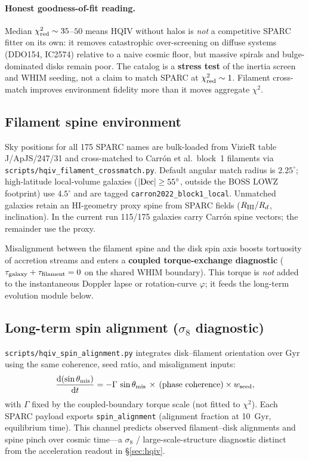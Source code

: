 \documentclass[11pt]{amsart}
\begin{document}
\paragraph{Honest goodness-of-fit reading.}
Median $\chi^2_{\rm red}\sim 35$--$50$ means HQIV without halos is \emph{not} a
competitive SPARC fitter on its own: it removes catastrophic over-screening on diffuse
systems (DDO154, IC2574) relative to a naive cosmic floor, but massive spirals and
bulge-dominated disks remain poor. The catalog is a \textbf{stress test} of the inertia
screen and WHIM seeding, not a claim to match SPARC at $\chi^2_{\rm red}\sim 1$.
Filament cross-match improves environment fidelity more than it moves aggregate $\chi^2$.

\subsection{Filament spine environment}
Sky positions for all 175 SPARC names are bulk-loaded from VizieR table
J/ApJS/247/31 and cross-matched to Carrón et al.\ block~1 filaments
\cite{carron2022filaments} via \texttt{scripts/hqiv\_filament\_crossmatch.py}.
Default angular match radius is $2.25^\circ$; high-latitude local-volume galaxies
($|{\rm Dec}|\ge 55^\circ$, outside the BOSS LOWZ footprint) use $4.5^\circ$ and are
tagged \texttt{carron2022\_block1\_local}. Unmatched galaxies retain an HI-geometry
proxy spine from SPARC fields ($R_{\rm HI}/R_d$, inclination). In the current run
115/175 galaxies carry Carrón spine vectors; the remainder use the proxy.

Misalignment between the filament spine and the disk spin axis boosts tortuosity of
accretion streams and enters a \textbf{coupled torque-exchange diagnostic}
($\tau_{\rm galaxy}+\tau_{\rm filament}=0$ on the shared WHIM boundary). This torque
is \emph{not} added to the instantaneous Doppler lapse or rotation-curve $\varphi$;
it feeds the long-term evolution module below.

\subsection{Long-term spin alignment ($\sigma_8$ diagnostic)}
\texttt{scripts/hqiv\_spin\_alignment.py} integrates disk--filament orientation over
Gyr using the same coherence, seed ratio, and misalignment inputs:
\[
\frac{{\rm d}(\sin\theta_{\rm mis})}{{\rm d}t}
  = -\Gamma\,\sin\theta_{\rm mis}\,\times\,\text{(phase coherence)}\times w_{\rm seed},
\]
with $\Gamma$ fixed by the coupled-boundary torque scale (not fitted to $\chi^2$).
Each SPARC payload exports \texttt{spin\_alignment} (alignment fraction at 10~Gyr,
equilibrium time). This channel predicts observed filament--disk alignments and spine
pinch over cosmic time---a $\sigma_8$ / large-scale-structure diagnostic distinct from
the acceleration readout in \S\ref{sec:hqiv}.
\end{document}
